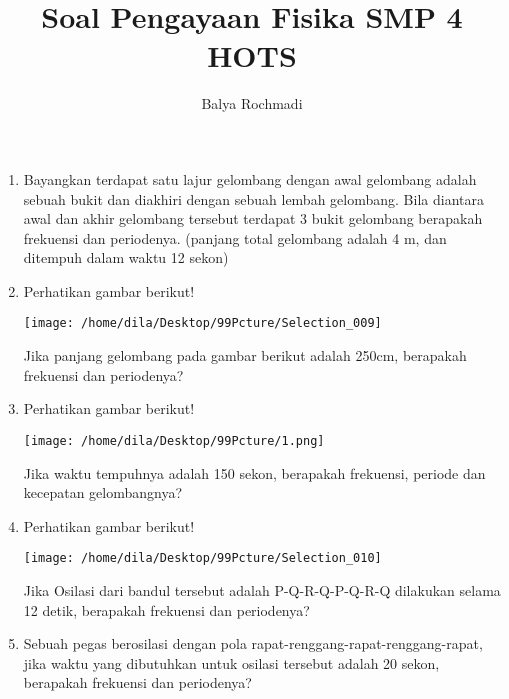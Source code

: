 \documentclass[12pt,a4paper,draft,final,oneside,twoside,openright,openany]{article}
\author{Balya Rochmadi}
\title{Soal Pengayaan Fisika SMP 4 HOTS}
\begin{document}
	\maketitle
	\begin{enumerate}
		\item Bayangkan terdapat satu lajur gelombang dengan awal gelombang adalah sebuah bukit dan diakhiri dengan sebuah lembah gelombang. Bila diantara awal dan akhir gelombang tersebut terdapat 3 bukit gelombang berapakah frekuensi dan periodenya. (panjang total gelombang adalah 4 m, dan ditempuh dalam waktu 12 sekon)
		\item Perhatikan gambar berikut!
		\begin{center}
			\texttt{[image: /home/dila/Desktop/99Pcture/Selection\_009]}
		\end{center}
		Jika panjang gelombang pada gambar berikut adalah 250cm, berapakah frekuensi dan periodenya? 
		\item Perhatikan gambar berikut!
		\begin{center}
			\texttt{[image: /home/dila/Desktop/99Pcture/1.png]}
		\end{center}
		Jika waktu tempuhnya adalah 150 sekon, berapakah frekuensi, periode dan kecepatan gelombangnya?
		\item Perhatikan gambar berikut!
		\begin{center}
				\texttt{[image: /home/dila/Desktop/99Pcture/Selection\_010]}
		\end{center}
		Jika Osilasi dari bandul tersebut adalah P-Q-R-Q-P-Q-R-Q dilakukan selama 12 detik, berapakah frekuensi dan periodenya?
		\item Sebuah pegas berosilasi dengan pola rapat-renggang-rapat-renggang-rapat, jika waktu yang dibutuhkan untuk osilasi tersebut adalah 20 sekon, berapakah frekuensi dan periodenya?
		
	\end{enumerate}

		
\end{document}
